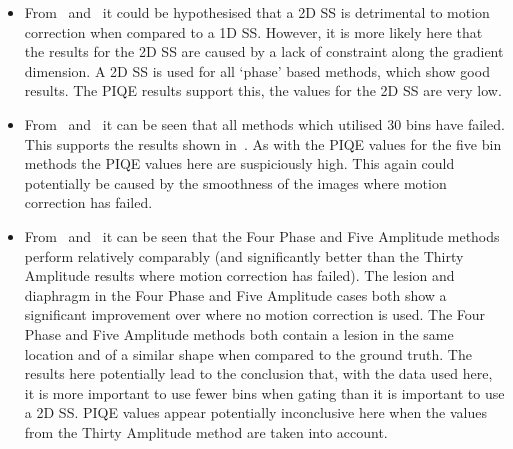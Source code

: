 \begin{itemize}
                \item From~ and~ it could be hypothesised that a \gls{2D} \gls{SS} is detrimental to motion correction when compared to a \gls{1D} \gls{SS}. However, it is more likely here that the results for the \gls{2D} \gls{SS} are caused by a lack of constraint along the gradient dimension. A \gls{2D} \gls{SS} is used for all `phase' based methods, which show good results. The \gls{PIQE} results support this, the values for the \gls{2D} \gls{SS} are very low.

                \item From~ and~ it can be seen that all methods which utilised $30$ bins have failed. This supports the results shown in~. As with the \gls{PIQE} values for the five bin methods the \gls{PIQE} values here are suspiciously high. This again could potentially be caused by the smoothness of the images where motion correction has failed.

                \item From~ and~ it can be seen that the Four Phase and Five Amplitude methods perform relatively comparably (and significantly better than the Thirty Amplitude results where motion correction has failed). The lesion and diaphragm in the Four Phase and Five Amplitude cases both show a significant improvement over where no motion correction is used. The Four Phase and Five Amplitude methods both contain a lesion in the same location and of a similar shape when compared to the ground truth. The results here potentially lead to the conclusion that, with the data used here, it is more important to use fewer bins when gating than it is important to use a \gls{2D} \gls{SS}. \gls{PIQE} values appear potentially inconclusive here when the values from the Thirty Amplitude method are taken into account.
            \end{itemize}

